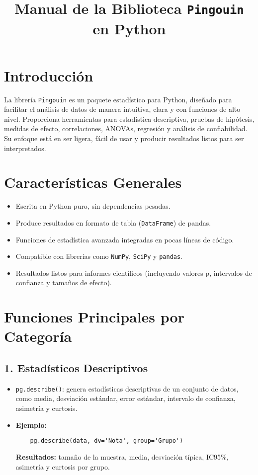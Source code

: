 \documentclass[12pt,a4paper]{article}
\title{Manual de la Biblioteca \texttt{Pingouin} en Python}
\author{ }
\date{ }
\begin{document}
\maketitle

\tableofcontents
\newpage

\section{Introducción}
La librería \texttt{Pingouin} es un paquete estadístico para Python, diseñado para facilitar el análisis de datos de manera intuitiva, clara y con funciones de alto nivel. Proporciona herramientas para estadística descriptiva, pruebas de hipótesis, medidas de efecto, correlaciones, ANOVAs, regresión y análisis de confiabilidad. Su enfoque está en ser ligera, fácil de usar y producir resultados listos para ser interpretados.

\section{Características Generales}
\begin{itemize}
    \item Escrita en Python puro, sin dependencias pesadas.
    \item Produce resultados en formato de tabla (\texttt{DataFrame}) de pandas.
    \item Funciones de estadística avanzada integradas en pocas líneas de código.
    \item Compatible con librerías como \texttt{NumPy}, \texttt{SciPy} y \texttt{pandas}.
    \item Resultados listos para informes científicos (incluyendo valores p, intervalos de confianza y tamaños de efecto).
\end{itemize}

\section{Funciones Principales por Categoría}

\subsection{1. Estadísticos Descriptivos}
\begin{itemize}
    \item \texttt{pg.describe()}: genera estadísticas descriptivas de un conjunto de datos, como media, desviación estándar, error estándar, intervalo de confianza, asimetría y curtosis.
    \item \textbf{Ejemplo:}
    \begin{verbatim}
    pg.describe(data, dv='Nota', group='Grupo')
    \end{verbatim}
    \textbf{Resultados:} tamaño de la muestra, media, desviación típica, IC95\%, asimetría y curtosis por grupo.
\end{itemize}
\end{document}
